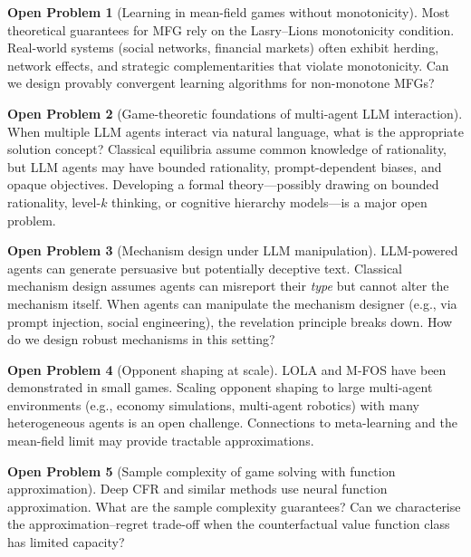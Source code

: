\documentclass[11pt,a4paper]{article}
\theoremstyle{plain}
\theoremstyle{definition}
\newtheorem{openproblem}{Open Problem}
\begin{document}
\begin{openproblem}[Learning in mean-field games without monotonicity]
Most theoretical guarantees for MFG rely on the Lasry--Lions monotonicity
condition.  Real-world systems (social networks, financial markets)
often exhibit herding, network effects, and strategic complementarities
that violate monotonicity.  Can we design provably convergent learning
algorithms for non-monotone MFGs?
\end{openproblem}

\begin{openproblem}[Game-theoretic foundations of multi-agent LLM interaction]
When multiple LLM agents interact via natural language, what is the
appropriate solution concept?  Classical equilibria assume common
knowledge of rationality, but LLM agents may have bounded rationality,
prompt-dependent biases, and opaque objectives.  Developing a formal
theory---possibly drawing on bounded rationality, level-$k$ thinking, or
cognitive hierarchy models---is a major open problem.
\end{openproblem}

\begin{openproblem}[Mechanism design under LLM manipulation]
LLM-powered agents can generate persuasive but potentially deceptive
text.  Classical mechanism design assumes agents can misreport their
\emph{type} but cannot alter the mechanism itself.  When agents can
manipulate the mechanism designer (e.g., via prompt injection, social
engineering), the revelation principle breaks down.  How do we design
robust mechanisms in this setting?
\end{openproblem}

\begin{openproblem}[Opponent shaping at scale]
LOLA and M-FOS have been demonstrated in small games.  Scaling opponent
shaping to large multi-agent environments (e.g., economy simulations,
multi-agent robotics) with many heterogeneous agents is an open
challenge.  Connections to meta-learning and the mean-field limit may
provide tractable approximations.
\end{openproblem}

\begin{openproblem}[Sample complexity of game solving with function approximation]
Deep CFR and similar methods use neural function approximation.  What
are the sample complexity guarantees?  Can we characterise the
approximation--regret trade-off when the counterfactual value function
class has limited capacity?
\end{openproblem}
\end{document}
